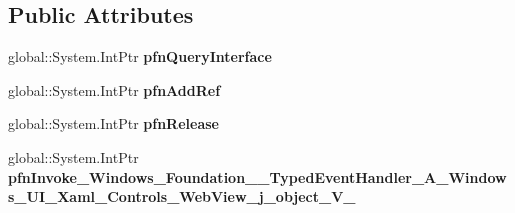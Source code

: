 \subsection*{Public Attributes}
\begin{DoxyCompactItemize}
\item 
\mbox{\label{struct_windows_1_1_foundation_1_1_typed_event_handler___a___windows___u_i___xaml___controls___weea5b22fbafcb30e85441c364b622cfb7_a4219a67c1c13609d2ec682b8006d8884}} 
global\+::\+System.\+Int\+Ptr {\bfseries pfn\+Query\+Interface}
\item 
\mbox{\label{struct_windows_1_1_foundation_1_1_typed_event_handler___a___windows___u_i___xaml___controls___weea5b22fbafcb30e85441c364b622cfb7_adf2ed3292d1f762606f11673e66bb09f}} 
global\+::\+System.\+Int\+Ptr {\bfseries pfn\+Add\+Ref}
\item 
\mbox{\label{struct_windows_1_1_foundation_1_1_typed_event_handler___a___windows___u_i___xaml___controls___weea5b22fbafcb30e85441c364b622cfb7_aa8570ea817804d7286dbdda21cd437f5}} 
global\+::\+System.\+Int\+Ptr {\bfseries pfn\+Release}
\item 
\mbox{\label{struct_windows_1_1_foundation_1_1_typed_event_handler___a___windows___u_i___xaml___controls___weea5b22fbafcb30e85441c364b622cfb7_a5d52a406a36381f29d8e57be0a18265b}} 
global\+::\+System.\+Int\+Ptr {\bfseries pfn\+Invoke\+\_\+\+Windows\+\_\+\+Foundation\+\_\+\+\_\+\+Typed\+Event\+Handler\+\_\+\+A\+\_\+\+Windows\+\_\+\+U\+I\+\_\+\+Xaml\+\_\+\+Controls\+\_\+\+Web\+View\+\_\+j\+\_\+object\+\_\+\+V\+\_\+}
\end{DoxyCompactItemize}
